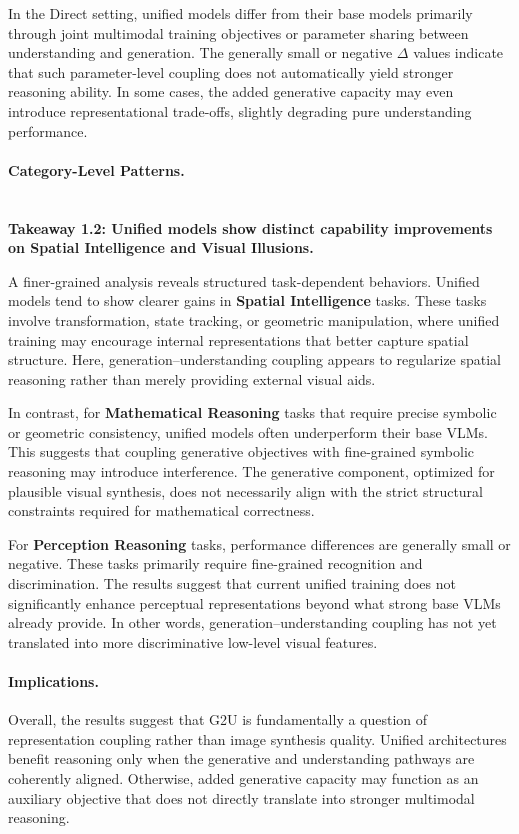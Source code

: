 \documentclass{article}
\theoremstyle{plain}
\theoremstyle{definition}
\theoremstyle{remark}
\begin{document}
In the Direct setting, unified models differ from their base models primarily through joint multimodal training objectives or parameter sharing between understanding and generation.
The generally small or negative $\Delta$ values indicate that such parameter-level coupling does not automatically yield stronger reasoning ability.
In some cases, the added generative capacity may even introduce representational trade-offs, slightly degrading pure understanding performance.

\paragraph{Category-Level Patterns.}
~\\
\textbf{Takeaway 1.2: Unified models show distinct capability improvements on Spatial Intelligence and Visual Illusions.}



A finer-grained analysis reveals structured task-dependent behaviors.
Unified models tend to show clearer gains in \textbf{Spatial Intelligence} tasks.
These tasks involve transformation, state tracking, or geometric manipulation, where unified training may encourage internal representations that better capture spatial structure.
Here, generation--understanding coupling appears to regularize spatial reasoning rather than merely providing external visual aids.

In contrast, for \textbf{Mathematical Reasoning} tasks that require precise symbolic or geometric consistency, unified models often underperform their base VLMs.
This suggests that coupling generative objectives with fine-grained symbolic reasoning may introduce interference.
The generative component, optimized for plausible visual synthesis, does not necessarily align with the strict structural constraints required for mathematical correctness.

For \textbf{Perception Reasoning} tasks, performance differences are generally small or negative.
These tasks primarily require fine-grained recognition and discrimination.
The results suggest that current unified training does not significantly enhance perceptual representations beyond what strong base VLMs already provide.
In other words, generation--understanding coupling has not yet translated into more discriminative low-level visual features.

\paragraph{Implications.}
Overall, the results suggest that G2U is fundamentally a question of representation coupling rather than image synthesis quality.
Unified architectures benefit reasoning only when the generative and understanding pathways are coherently aligned.
Otherwise, added generative capacity may function as an auxiliary objective that does not directly translate into stronger multimodal reasoning.
\end{document}
